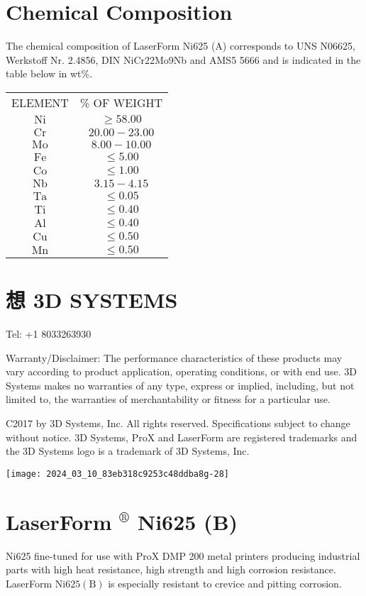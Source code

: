 \documentclass[10pt]{article}
\begin{document}
\section*{Chemical Composition}
The chemical composition of LaserForm Ni625 (A) corresponds to UNS N06625, Werkstoff Nr. 2.4856, DIN NiCr22Mo9Nb and AMS5 5666 and is indicated in the table below in wt\%.

\begin{center}
\begin{tabular}{cc}
ELEMENT & \% OF WEIGHT \\
$\mathrm{Ni}$ & $\geq 58.00$ \\
$\mathrm{Cr}$ & $20.00-23.00$ \\
$\mathrm{Mo}$ & $8.00-10.00$ \\
$\mathrm{Fe}$ & $\leq 5.00$ \\
$\mathrm{Co}$ & $\leq 1.00$ \\
$\mathrm{Nb}$ & $3.15-4.15$ \\
$\mathrm{Ta}$ & $\leq 0.05$ \\
$\mathrm{Ti}$ & $\leq 0.40$ \\
$\mathrm{Al}$ & $\leq 0.40$ \\
$\mathrm{Cu}$ & $\leq 0.50$ \\
$\mathrm{Mn}$ & $\leq 0.50$ \\
\end{tabular}
\end{center}

\section*{想 3D SYSTEMS}
Tel: +1 8033263930

Warranty/Disclaimer: The performance characteristics of these products may vary according to product application, operating conditions, or with end use. 3D Systems makes no warranties of any type, express or implied, including, but not limited to, the warranties of merchantability or fitness for a particular use.

C2017 by 3D Systems, Inc. All rights reserved. Specifications subject to change without notice. 3D Systems, ProX and LaserForm are registered trademarks and the 3D Systems logo is a trademark of 3D Systems, Inc.

\begin{center}
\texttt{[image: 2024\_03\_10\_83eb318c9253c48ddba8g-28]}
\end{center}

\section*{LaserForm ${ }^{\circledR}$ Ni625 (B)}
Ni625 fine-tuned for use with ProX DMP 200 metal printers producing industrial parts with high heat resistance, high strength and high corrosion resistance. LaserForm $\mathrm{Ni625}(\mathrm{B})$ is especially resistant to crevice and pitting corrosion.
\end{document}
